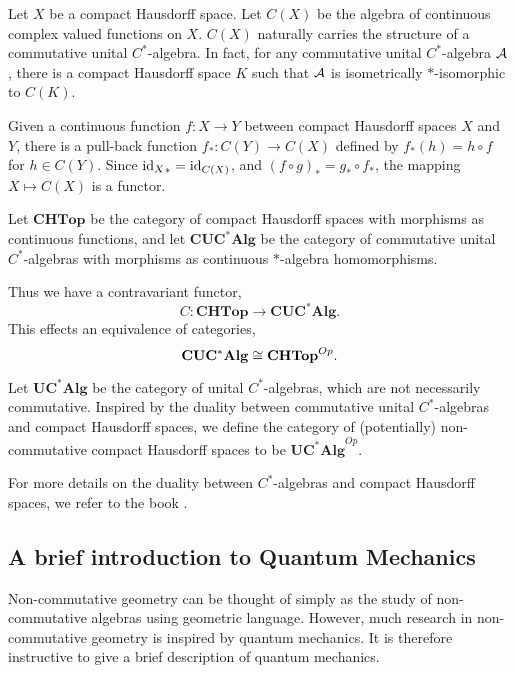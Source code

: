 \begin{example}
    Let $X$ be a compact Hausdorff space. Let $C(X)$ be the algebra
    of continuous complex valued functions on $X$. $C(X)$ naturally carries
    the structure of a commutative unital $C^*$-algebra. In fact, for any commutative
    unital $C^*$-algebra $\mathcal{A}$, there is a compact Hausdorff space $K$
    such that $\mathcal{A}$ is isometrically $*$-isomorphic to $C(K)$.
    
    Given a continuous function $f:X\rightarrow Y$ between compact Hausdorff spaces
    $X$ and $Y$, there is a pull-back function $f_*:C(Y)\rightarrow C(X)$ defined
    by $f_*(h) = h\circ f$ for $h \in C(Y)$. Since ${\operatorname{id}_X}_* = \operatorname{id}_{C(X)}$, 
    and $(f\circ g)_* = g_* \circ f_*$, the mapping $X\mapsto C(X)$
    is a functor. 
    
    Let $\mathbf{CHTop}$ be the category of compact Hausdorff spaces
    with morphisms as continuous functions, and let $\mathbf{CUC^*Alg}$
    be the category of commutative unital $C^*$-algebras with morphisms
    as continuous $*$-algebra homomorphisms.
    
    Thus we have a contravariant functor,
    \begin{equation}
        C:\mathbf{CHTop}\rightarrow \mathbf{CUC^*Alg}.
    \end{equation}
    This effects an equivalence of categories,
    \begin{equation}
        \mathbf{CUC^*Alg} \cong \mathbf{CHTop}^{Op}.
    \end{equation}
    
    Let $\mathbf{UC^*Alg}$ be the category of unital $C^*$-algebras,
    which are not necessarily commutative. Inspired by the duality between commutative
    unital $C^*$-algebras and compact Hausdorff spaces, we define
    the category of (potentially) non-commutative compact Hausdorff spaces
    to be $\mathbf{UC^*Alg}^{Op}$.
\end{example}
For more details on the duality between $C^*$-algebras
and compact Hausdorff spaces, we refer to the book \cite{Sakai1971}.

\subsection{A brief introduction to Quantum Mechanics}
Non-commutative geometry can be thought of simply as the study of non-commutative
algebras using geometric language. However, much research in non-commutative
geometry is inspired by quantum mechanics. It is therefore instructive to 
give a brief description of quantum mechanics. 


